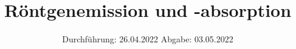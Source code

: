 

\subject{V602}
\title{Röntgenemission und -absorption}
\date{%
  Durchführung: 26.04.2022
  \hspace{3em}
  Abgabe: 03.05.2022
}



\maketitle
\thispagestyle{empty}
\tableofcontents
\newpage






\printbibliography{}


